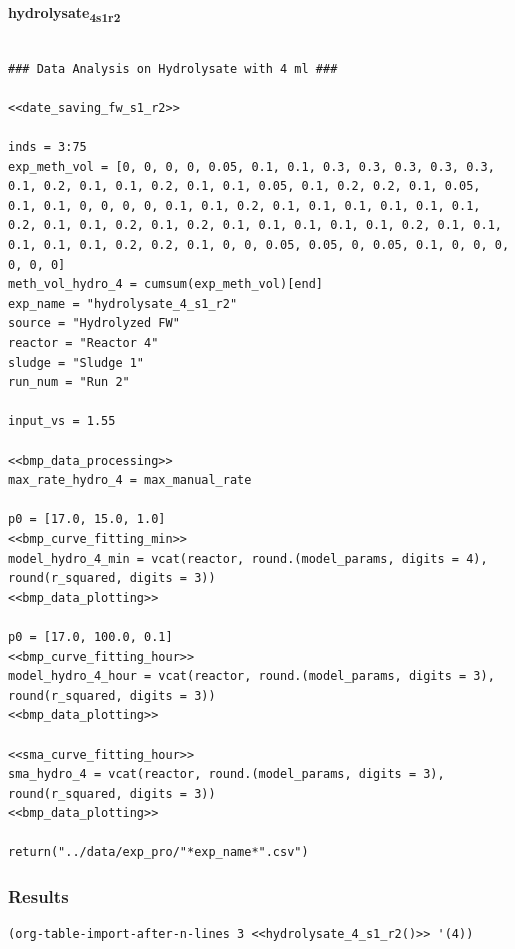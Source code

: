 \documentclass[11pt]{article}
\begin{document}
\textbf{hydrolysate\textsubscript{4}\textsubscript{s1}\textsubscript{r2}}
\begin{verbatim}

### Data Analysis on Hydrolysate with 4 ml ###

<<date_saving_fw_s1_r2>>

inds = 3:75
exp_meth_vol = [0, 0, 0, 0, 0.05, 0.1, 0.1, 0.3, 0.3, 0.3, 0.3, 0.3, 0.1, 0.2, 0.1, 0.1, 0.2, 0.1, 0.1, 0.05, 0.1, 0.2, 0.2, 0.1, 0.05, 0.1, 0.1, 0, 0, 0, 0, 0.1, 0.1, 0.2, 0.1, 0.1, 0.1, 0.1, 0.1, 0.1, 0.2, 0.1, 0.1, 0.2, 0.1, 0.2, 0.1, 0.1, 0.1, 0.1, 0.1, 0.2, 0.1, 0.1, 0.1, 0.1, 0.1, 0.2, 0.2, 0.1, 0, 0, 0.05, 0.05, 0, 0.05, 0.1, 0, 0, 0, 0, 0, 0]
meth_vol_hydro_4 = cumsum(exp_meth_vol)[end]
exp_name = "hydrolysate_4_s1_r2"
source = "Hydrolyzed FW"
reactor = "Reactor 4"
sludge = "Sludge 1"
run_num = "Run 2"

input_vs = 1.55

<<bmp_data_processing>>
max_rate_hydro_4 = max_manual_rate

p0 = [17.0, 15.0, 1.0]
<<bmp_curve_fitting_min>>
model_hydro_4_min = vcat(reactor, round.(model_params, digits = 4), round(r_squared, digits = 3))
<<bmp_data_plotting>>

p0 = [17.0, 100.0, 0.1]
<<bmp_curve_fitting_hour>>
model_hydro_4_hour = vcat(reactor, round.(model_params, digits = 3), round(r_squared, digits = 3))
<<bmp_data_plotting>>

<<sma_curve_fitting_hour>>
sma_hydro_4 = vcat(reactor, round.(model_params, digits = 3), round(r_squared, digits = 3))
<<bmp_data_plotting>>

return("../data/exp_pro/"*exp_name*".csv")
\end{verbatim}

\subsubsection{Results}
\label{sec:orgf353eff}

\begin{verbatim}
(org-table-import-after-n-lines 3 <<hydrolysate_4_s1_r2()>> '(4))
\end{verbatim}
\end{document}
